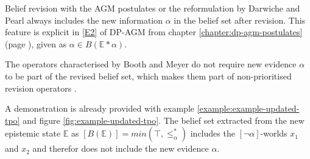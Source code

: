 \documentclass[english, 12pt]{scrartcl}
\theoremstyle{definition}
\theoremstyle{definition}
\theoremstyle{definition}
\begin{document}
Belief revision with the AGM postulates \cite{Alchourron1985} or the reformulation by Darwiche and Pearl \cite{Darwiche1997} always includes the new information $\alpha$ in the belief set after revision. This feature is explicit in \ref{E2} of DP-AGM from chapter \ref{chapter:dp-agm-postulates} (page \pageref{chapter:dp-agm-postulates}), given as $\alpha \in B(\mathbb{E}\ast\alpha)$.

The operators characterised by Booth and Meyer do not require new evidence $\alpha$ to be part of the revised belief set, which makes them part of non-prioritised revision operators \cite{Hansson1999}.

A demonstration is already provided with example \ref{example:example-updated-tpo} and figure \ref{fig:example-updated-tpo}. The belief set extracted from the new epistemic state $\mathbb{E}$ as $[B(\mathbb{E})] = min(\top, \leq_{\alpha}^{\ast})$ includes the $[\neg\alpha]$-worlds $x_{1}$ and $x_{2}$ and therefor does not include the new evidence $\alpha$.

\newpage
\end{document}

